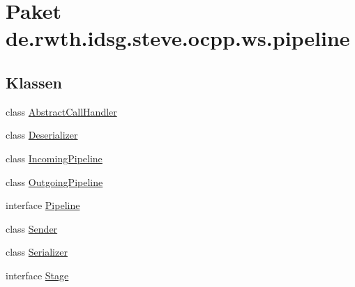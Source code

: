\hypertarget{namespacede_1_1rwth_1_1idsg_1_1steve_1_1ocpp_1_1ws_1_1pipeline}{\section{Paket de.\-rwth.\-idsg.\-steve.\-ocpp.\-ws.\-pipeline}
\label{namespacede_1_1rwth_1_1idsg_1_1steve_1_1ocpp_1_1ws_1_1pipeline}
}
\subsection*{Klassen}
\begin{DoxyCompactItemize}
\item 
class \hyperlink{classde_1_1rwth_1_1idsg_1_1steve_1_1ocpp_1_1ws_1_1pipeline_1_1_abstract_call_handler}{Abstract\-Call\-Handler}
\item 
class \hyperlink{classde_1_1rwth_1_1idsg_1_1steve_1_1ocpp_1_1ws_1_1pipeline_1_1_deserializer}{Deserializer}
\item 
class \hyperlink{classde_1_1rwth_1_1idsg_1_1steve_1_1ocpp_1_1ws_1_1pipeline_1_1_incoming_pipeline}{Incoming\-Pipeline}
\item 
class \hyperlink{classde_1_1rwth_1_1idsg_1_1steve_1_1ocpp_1_1ws_1_1pipeline_1_1_outgoing_pipeline}{Outgoing\-Pipeline}
\item 
interface \hyperlink{interfacede_1_1rwth_1_1idsg_1_1steve_1_1ocpp_1_1ws_1_1pipeline_1_1_pipeline}{Pipeline}
\item 
class \hyperlink{classde_1_1rwth_1_1idsg_1_1steve_1_1ocpp_1_1ws_1_1pipeline_1_1_sender}{Sender}
\item 
class \hyperlink{classde_1_1rwth_1_1idsg_1_1steve_1_1ocpp_1_1ws_1_1pipeline_1_1_serializer}{Serializer}
\item 
interface \hyperlink{interfacede_1_1rwth_1_1idsg_1_1steve_1_1ocpp_1_1ws_1_1pipeline_1_1_stage}{Stage}
\end{DoxyCompactItemize}
